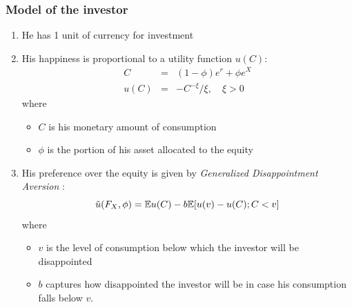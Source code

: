 \documentclass{beamer}
\begin{document}
\begin{frame}
  \frametitle{Model of the investor}
  \begin{enumerate}
  \item He has 1 unit of currency for investment
  \item His happiness is proportional to a utility function $u(C)$:
    \begin{eqnarray*}
      C &=& (1 - \phi)e^r + \phi e^X \\
      u(C) &=& -C^{-\xi}/\xi, \quad \xi > 0 
    \end{eqnarray*}
    where
    \begin{itemize}
    \item $C$ is his monetary amount of consumption
    \item $\phi$ is the portion of his asset allocated to the equity
    \end{itemize}

  \item His preference over the equity is given by {\em
      Generalized Disappointment Aversion} \cite{routledge2010generalized}:
    \[
    \tilde u (F_X, \phi) = \mathbb{E} u(C) - b \mathbb{E} [u(v) - u(C); C < v]
    \]
    where
    \begin{itemize}
    \item $v$ is the level of consumption below which
      the investor will be disappointed
    \item $b$ captures how disappointed the investor will be in case his consumption
      falls below $v$.
    \end{itemize}
  \end{enumerate}
\end{frame}
\end{document}
